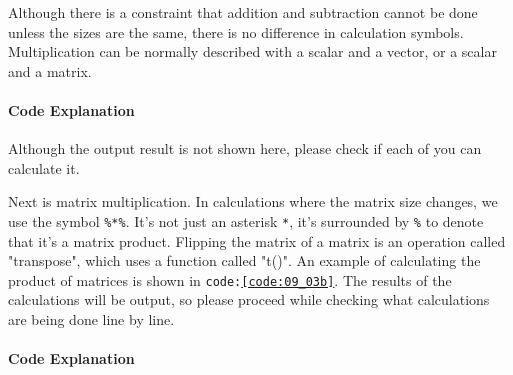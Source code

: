 \documentclass{ltjsbook}
\begin{document}
Although there is a constraint that addition and subtraction cannot be done unless the sizes are the same, there is no difference in calculation symbols.
Multiplication can be normally described with a scalar and a vector, or a scalar and a matrix.


\paragraph{Code Explanation}


Although the output result is not shown here, please check if each of you can calculate it.

Next is matrix multiplication. In calculations where the matrix size changes, we use the symbol \verb|%*%|. It's not just an asterisk \verb|*|, it's surrounded by \verb|%| to denote that it's a matrix product.
Flipping the matrix of a matrix is an operation called "transpose", which uses a function called "t()".
An example of calculating the product of matrices is shown in \texttt{code:\ref{code:09_03b}}. The results of the calculations will be output, so please proceed while checking what calculations are being done line by line.


\paragraph{Code Explanation}

\end{document}

